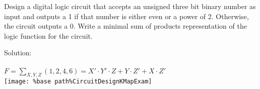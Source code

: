 Design a digital logic circuit that accepts an unsigned three bit binary number as input and outputs a 1 if that number is either even or a power of 2.  Otherwise, the circuit outputs a 0.  Write a minimal sum of products representation of the logic function for the circuit.

Solution: \\ \\
$F=\sum_{X,Y,Z}(1,2,4,6)=X' \cdot Y' \cdot Z + Y \cdot Z' + X \cdot Z'$\\
\texttt{[image: \%base path\%CircuitDesignKMapExam]}\\
